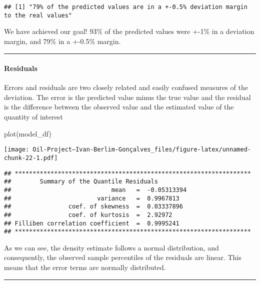 \documentclass[
]{article}
\newenvironment{Shaded}{\begin{snugshade}}{\end{snugshade}}
\newcommand{\FunctionTok}[1]{\textcolor[rgb]{0.00,0.00,0.00}{#1}}
\newcommand{\NormalTok}[1]{#1}
\begin{document}
\begin{verbatim}
## [1] "79% of the predicted values are in a +-0.5% deviation margin to the real values"
\end{verbatim}

We have achieved our goal! 93\% of the predicted values were +-1\% in a
deviation margin, and 79\% in a +-0.5\% margin.

\begin{center}\rule{0.5\linewidth}{0.5pt}\end{center}

\hypertarget{residuals}{%
\paragraph{Residuals}\label{residuals}}

Errors and residuals are two closely related and easily confused
measures of the deviation. The error is the predicted value minus the
true value and the residual is the difference between the observed value
and the estimated value of the quantity of interest

\begin{Shaded}
\begin{Highlighting}[]
\FunctionTok{plot}\NormalTok{(model\_df)}
\end{Highlighting}
\end{Shaded}

\texttt{[image: Oil-Project---Ivan-Berlim-Gonçalves\_files/figure-latex/unnamed-chunk-22-1.pdf]}

\begin{verbatim}
## ******************************************************************
##        Summary of the Quantile Residuals
##                            mean   =  -0.05313394 
##                        variance   =  0.9967813 
##                coef. of skewness  =  0.03337896 
##                coef. of kurtosis  =  2.92972 
## Filliben correlation coefficient  =  0.9995241 
## ******************************************************************
\end{verbatim}

As we can see, the density estimate follows a normal distribution, and
consequently, the observed sample percentiles of the residuals are
linear. This means that the error terms are normally distributed.

\begin{center}\rule{0.5\linewidth}{0.5pt}\end{center}
\end{document}

